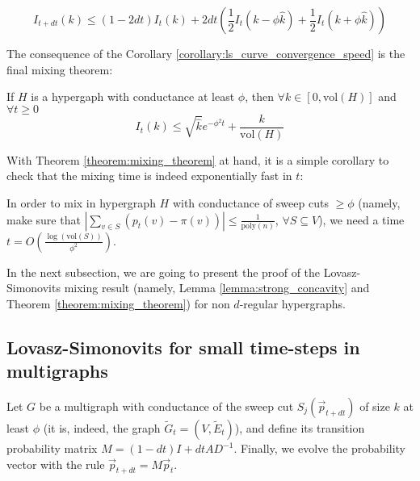 \documentclass[../main.tex]{subfiles}
\begin{document}
\begin{corollary}
\label{corollary:ls_curve_convergence_speed}
    \begin{equation}
        I_{t+dt}(k) \leq (1 - 2dt) I_t(k) + 2dt\left(\frac{1}{2} I_t(k - \phi \hat{k}) + \frac{1}{2}I_t(k + \phi \hat{k})\right)
    \end{equation}
\end{corollary}

The consequence of the Corollary \ref{corollary:ls_curve_convergence_speed} is the final mixing theorem:

\begin{theorem}
\label{theorem:mixing_theorem}
    If $H$ is a hypergaph with conductance at least $\phi$, then $\forall k \in [0, \text{vol}(H)]$ and $\forall t \geq 0$
    \begin{equation}
        I_t(k) \leq \sqrt{\hat{k}} e^{-\phi^2 t} + \frac{k}{\text{vol}(H)}
    \end{equation}
\end{theorem}

With Theorem \ref{theorem:mixing_theorem} at hand, it is a simple corollary to check that the mixing time is indeed exponentially fast in $t$:

\begin{corollary}
    In order to mix in hypergraph $H$ with conductance of sweep cuts $\geq \phi$ (namely, make sure that $|\sum_{v\in S} (p_t(v) - \pi(v))| \leq \frac{1}{\text{poly}(n)}$, $\forall S\subseteq V$), we need a time $t = O\left(\frac{\log(\text{vol}(S))}{\phi^2}\right)$.
\end{corollary}

In the next subsection, we are going to present the proof of the Lovasz-Simonovits mixing result (namely, Lemma \ref{lemma:strong_concavity} and Theorem \ref{theorem:mixing_theorem}) for non $d$-regular hypergraphs.

\subsection{Lovasz-Simonovits for small time-steps in multigraphs}

Let $G$ be a multigraph with conductance of the sweep cut $S_j(\vec{p}_{t+dt})$ of size $k$ at least $\phi$ (it is, indeed, the graph $\tilde{G}_t = (V, \tilde{E}_t)$), and define its transition probability matrix $M = (1 - dt) I + dt A D^{-1}$. Finally, we evolve the probability vector with the rule $\vec{p}_{t+dt} = M \vec{p}_t$. 
\end{document}
